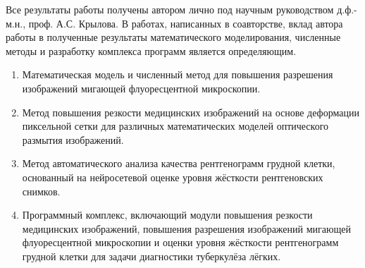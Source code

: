 {\contribution} 

Все результаты работы получены автором лично под научным руководством д.ф.-м.н., проф. А.С. Крылова. В работах, написанных в соавторстве, вклад автора работы в полученные результаты математического моделирования, численные методы и разработку комплекса программ является определяющим.


{}

\begin {enumerate}[beginpenalty=10000]
	\item Математическая модель и численный метод для повышения разрешения изображений мигающей флуоресцентной микроскопии.
	
	\item Метод повышения резкости медицинских изображений на основе деформации пиксельной сетки для различных математических моделей оптического размытия изображений.
	
	\item Метод автоматического анализа качества рентгенограмм грудной клетки, основанный на нейросетевой оценке уровня жёсткости рентгеновских снимков.
	
	\item Программный комплекс, включающий модули повышения резкости медицинских изображений, повышения разрешения изображений мигающей флуоресцентной микроскопии и оценки уровня жёсткости рентгенограмм грудной клетки для задачи диагностики туберкулёза лёгких.
\end {enumerate}
